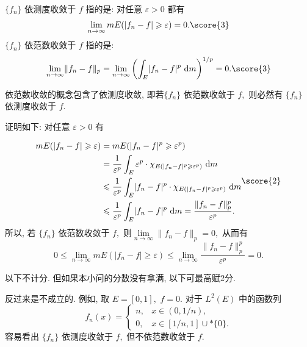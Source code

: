 \begin{solution}
$\{ f_n \}$ 依测度收敛于 $f$ 指的是: 对任意 $\varepsilon > 0$ 都有
\begin{equation*}
\lim\limits_{n \to \infty} m E(\lvert f_n - f\rvert \geqslant \varepsilon) = 0. \score{3}
\end{equation*}
$\{ f_n \}$ 依范数收敛于 $f$ 指的是:
\begin{equation*}
\lim\limits_{n\to\infty} \lVert f_n - f \rVert_p = \lim\limits_{n\to\infty} \left(\int_E \lvert f_n - f \rvert^p ~ \mathrm{d} m \right)^{1/p} = 0. \score{3}
\end{equation*}

依范数收敛的概念包含了依测度收敛, 即若$\{ f_n \}$ 依范数收敛于 $f,$ 则必然有 $\{ f_n \}$ 依测度收敛于 $f$. 

证明如下: 对任意 $\varepsilon > 0$ 有

\begin{equation*}
\begin{aligned}
m E ( \lvert f_n - f \rvert \geqslant \varepsilon) & = m E ( \lvert f_n - f \rvert^p \geqslant \varepsilon^p) \\
& = \dfrac{1}{\varepsilon^p} \int_E \varepsilon^p \cdot \chi_{E ( \lvert f_n - f \rvert^p \geqslant \varepsilon^p)} ~ \mathrm{d} m \\
& \leqslant \dfrac{1}{\varepsilon^p} \int_E \lvert f_n - f \rvert^p \cdot \chi_{E ( \lvert f_n - f \rvert^p \geqslant \varepsilon^p)} ~ \mathrm{d} m \\
& \leqslant \dfrac{1}{\varepsilon^p} \int_E \lvert f_n - f \rvert^p ~ \mathrm{d} m = \dfrac{\lVert f_n - f \rVert_p^p}{\varepsilon^p}.
\end{aligned} \score{2}
\end{equation*}
所以, 若 $\{ f_n \}$ 依范数收敛于 $f,$ 则$\lim\limits_{n \to\infty} \lVert f_n - f \rVert_p = 0,$ 从而有
$$
0 \leqslant \lim\limits_{n \to\infty} m E ( \lvert f_n - f \rvert \geqslant \varepsilon) \leqslant \lim\limits_{n \to\infty} \dfrac{\lVert f_n - f \rVert_p^p}{\varepsilon^p} = 0.
$$

以下不计分. 但如果本小问的分数没有拿满, 以下可最高赋2分.

反过来是不成立的. 例如, 取 $E = [0, 1],$ $f = 0.$ 对于 $L^2 (E)$ 中的函数列
\begin{equation*}
f_n(x) = \begin{cases}
n, & x \in (0, 1/n), \\
0, & x \in [1/n, 1] \cup* \{0\}.
\end{cases}
\end{equation*}
容易看出 $\{ f_n \}$ 依测度收敛于 $f,$ 但不依范数收敛于 $f.$
\end{solution}


